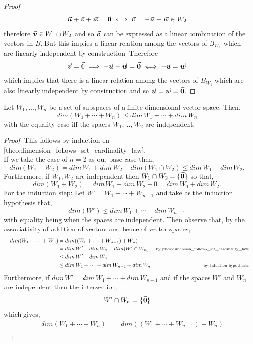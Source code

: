 \documentclass[MathsNotesBase.tex]{subfiles}
\begin{document}
{\begin{proof}
		\[ \vec{\bm{u}} + \vec{\bm{v}} + \vec{\bm{w}} = \vec{\bm{0}} \iff \vec{\bm{v}} = -\vec{\bm{u}} - \vec{\bm{w}} \in W_2 \]
		therefore ${ \vec{\bm{v}} \in W_1 \cap W_2 }$ and so $\vec{\bm{v}}$ can be expressed as a linear combination of the vectors in $B$. But this implies a linear relation among the vectors of $B_{W_1}$ which are linearly independent by construction. Therefore 
		\[ \vec{\bm{v}} = \vec{\bm{0}} \implies -\vec{\bm{u}} - \vec{\bm{w}} = \vec{\bm{0}} \iff -\vec{\bm{u}} = \vec{\bm{w}} \]
		which implies that there is a linear relation among the vectors of $B_{W_2}$ which are also linearly independent by construction and so ${ \vec{\bm{u}} = \vec{\bm{w}} = \vec{\bm{0}} }$.
	\end{proof}
	\begin{corollary}
		\label{coro:dimension_of_set_of_subspaces_leq_sum_of_dimension_of_each_subspace}
		Let ${ W_1, \dots, W_n }$ be a set of subspaces of a finite-dimensional vector space. Then,
		\[ dim(W_1 + \cdots + W_n) \leq dim\,W_1 + \cdots + dim\,W_n \]
		with the equality case iff the spaces ${ W_1, \dots, W_2 }$ are independent.
	\end{corollary}
	\begin{proof}
		This follows by induction on \autoref{theo:dimension_follows_set_cardinality_law}.\\		
		If we take the case of ${ n = 2 }$ as our base case then,
		\[ dim(W_1 + W_2) = dim\,W_1 + dim\,W_2 - dim(W_1 \cap W_2) \leq dim\,W_1 + dim\,W_2. \]
		Furthermore, if ${ W_1, W_2 }$ are independent then ${ W_1 \cap W_2 = \{\vec{\bm{0}}\} }$ so that,
		\[ dim(W_1 + W_2) = dim\,W_1 + dim\,W_2 - 0 = dim\,W_1 + dim\,W_2. \]
		For the induction step: Let ${ W' = W_1 + \cdots + W_{n-1} }$ and take as the induction hypothesis that,
		\[ dim(W') \leq dim\,W_1 + \cdots + dim\,W_{n-1} \]
		with equality being when the spaces are independent. Then observe that, by the associativity of addition of vectors and hence of vector spaces,
		\begin{align*}
		&& dim(W_1 + \cdots + W_n) &= dim((W_1 + \cdots + W_{n-1}) + W_n)  \\
		& &  &= dim\,W' + dim\,W_n - dim(W' \cap W_n)  &\sidecomment{by \autoref{theo:dimension_follows_set_cardinality_law}} \\
		& &  &\leq dim\,W' + dim\,W_n \\
		& &  &\leq dim\,W_1 + \cdots + dim\,W_{n-1} + dim\,W_n  &\sidecomment{by induction hypothesis.}
		\end{align*}
		Furthermore, if ${ dim\,W' = dim\,W_1 + \cdots + dim\,W_{n-1} }$ and if the spaces $W'$ and $W_n$ are independent then the intersection,
		\[ W' \cap W_n = \{\vec{\bm{0}}\} \]
		which gives,
		\begin{align*}
		&& dim(W_1 + \cdots + W_n) &= dim((W_1 + \cdots + W_{n-1}) + W_n)  \\

\end{align*}
\end{proof}}
\end{document}
